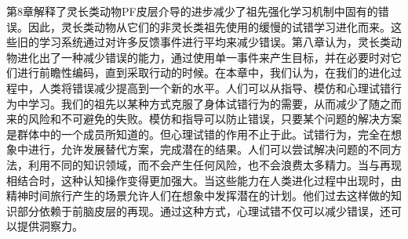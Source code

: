 第8章解释了灵长类动物PF皮层介导的进步减少了祖先强化学习机制中固有的错误。因此，灵长类动物从它们的非灵长类祖先使用的缓慢的试错学习进化而来。这些旧的学习系统通过对许多反馈事件进行平均来减少错误。第八章认为，灵长类动物进化出了一种减少错误的能力，通过使用单一事件来产生目标，并在必要时对它们进行前瞻性编码，直到采取行动的时候。在本章中，我们认为，在我们的进化过程中，人类将错误减少提高到一个新的水平。人们可以从指导、模仿和心理试错行为中学习。我们的祖先以某种方式克服了身体试错行为的需要，从而减少了随之而来的风险和不可避免的失败。模仿和指导可以防止错误，只要某个问题的解决方案是群体中的一个成员所知道的。但心理试错的作用不止于此。试错行为，完全在想象中进行，允许发展替代方案，完成潜在的结果。人们可以尝试解决问题的不同方法，利用不同的知识领域，而不会产生任何风险，也不会浪费太多精力。当与再现相结合时，这种认知操作变得更加强大。当这些能力在人类进化过程中出现时，由精神时间旅行产生的场景允许人们在想象中发挥潜在的计划。他们过去这样做的知识部分依赖于前脑皮层的再现。通过这种方式，心理试错不仅可以减少错误，还可以提供洞察力。

